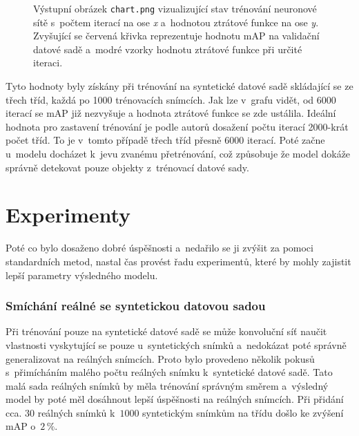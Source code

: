 \begin{figure}[H]
    \centering
    \caption{Výstupní obrázek \texttt{chart.png} vizualizující stav trénování neuronové sítě s~počtem iterací na ose \emph{x} a~hodnotou ztrátové funkce na ose \emph{y}. Zvyšující se červená křivka reprezentuje hodnotu mAP na validační datové sadě a~modré vzorky hodnotu ztrátové funkce při určité iteraci.}
    \label{fig:chart}
\end{figure}

Tyto hodnoty byly získány při trénování na syntetické datové sadě skládající se ze třech tříd, každá po 1000 trénovacích snímcích. Jak lze v~grafu vidět, od 6000 iterací se mAP již nezvyšuje a hodnota ztrátové funkce se zde ustálila. Ideální hodnota pro zastavení trénování je podle autorů dosažení počtu iterací 2000-krát počet tříd. To je v~tomto případě třech tříd přesně 6000 iterací. Poté začne u~modelu docházet k~jevu zvanému přetrénování, což způsobuje že model dokáže správně detekovat pouze objekty z~trénovací datové sady.

\section{Experimenty}
Poté co bylo dosaženo dobré úspěšnosti a~nedařilo se ji zvýšit za pomoci standardních metod, nastal čas provést řadu experimentů, které by mohly zajistit lepší parametry výsledného modelu.

\subsubsection*{Smíchání reálné se syntetickou datovou sadou}
Při trénování pouze na syntetické datové sadě se může konvoluční síť naučit vlastnosti vyskytující se pouze u~syntetických snímků a~nedokázat poté správně generalizovat na reálných snímcích. Proto bylo provedeno několik pokusů s~přimícháním malého počtu reálných snímku k~syntetické datové sadě. Tato malá sada reálných snímků by měla  trénování správným směrem a~výsledný model by poté měl dosáhnout lepší úspěšnosti na reálných snímcích. Při přidání cca. $30$ reálných snímků k~$1000$ syntetickým snímkům na třídu došlo ke zvýšení mAP o~$2\,\%$.

